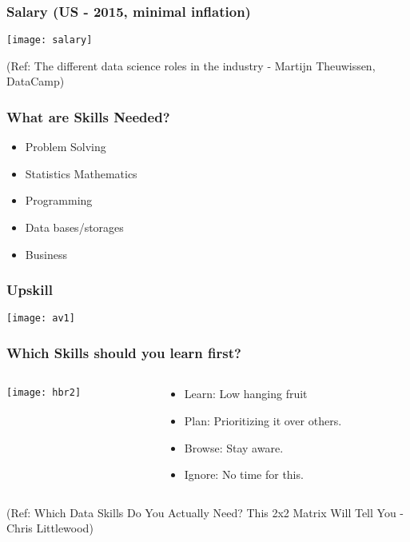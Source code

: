 \begin{frame}[fragile]\frametitle{Salary (US - 2015, minimal inflation)}

\begin{center}
\texttt{[image: salary]}
\end{center}

{\tiny (Ref: The different data science roles in the industry - Martijn Theuwissen, DataCamp)}
\end{frame}

\begin{frame}[fragile]\frametitle{What are Skills Needed?}
\begin{itemize}
\item Problem Solving
\item Statistics Mathematics
\item Programming
\item Data bases/storages
\item Business
\end{itemize}
\end{frame}

\begin{frame}[fragile]\frametitle{Upskill}
\begin{center}
\texttt{[image: av1]}
\end{center}

\end{frame}


\begin{frame}[fragile]\frametitle{Which Skills should you learn first?}
 
   \begin{columns}[t]
    \begin{column}{0.5\linewidth}
\begin{center}
\texttt{[image: hbr2]}
\end{center}
    \end{column}
    \begin{column}{0.5\linewidth}
\begin{itemize}
\item Learn: Low hanging fruit 
\item Plan: Prioritizing it over others.
\item Browse: Stay aware.
\item Ignore: No time for this.
\end{itemize}
    \end{column}
  \end{columns}
 

{\tiny (Ref: Which Data Skills Do You Actually Need? This 2x2 Matrix Will Tell You - Chris Littlewood)}
\end{frame}

